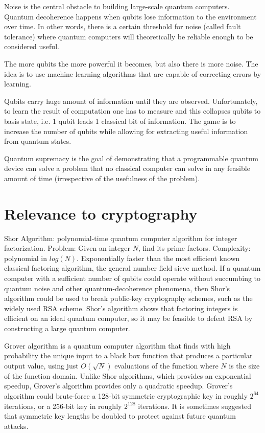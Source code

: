 Noise is the central obstacle to building large-scale quantum computers.  Quantum decoherence happens when qubits lose information to the environment over time. In other words, there is a certain threshold for noise (called fault tolerance) where quantum computers will theoretically be reliable enough to be considered useful.

The more qubits the more powerful it becomes, but also there is more noise. The idea is to use machine learning algorithms that are capable of correcting errors by learning.

Qubits carry huge amount of information until they are observed. Unfortunately, to learn the result of computation one has to measure and this collapses qubits to basis state, i.e. 1 qubit leads 1 classical bit of information. The game is to increase the number of qubits while allowing for extracting useful information from quantum states.

Quantum supremacy is the goal of demonstrating that a programmable quantum device can solve a problem that no classical computer can solve in any feasible amount of time (irrespective of the usefulness of the problem).

\section{Relevance to cryptography}

Shor Algorithm: polynomial-time quantum computer algorithm for integer factorization. Problem: Given an integer $N$, find its prime factors. Complexity: polynomial in $log(N)$. Exponentially faster than the most efficient known classical factoring algorithm, the general number field sieve method.
If a quantum computer with a sufficient number of qubits could operate without succumbing to quantum noise and other quantum-decoherence phenomena, then Shor's algorithm could be used to break public-key cryptography schemes, such as the widely used RSA scheme. Shor's algorithm shows that factoring integers is efficient on an ideal quantum computer, so it may be feasible to defeat RSA by constructing a large quantum computer.

Grover algorithm is a quantum computer algorithm that finds with high probability the unique input to a black box function that produces a particular output value, using just $O(\sqrt{N})$ evaluations of the function where $N$ is the size of the function domain. Unlike Shor algorithms, which provides an exponential speedup, Grover's algorithm provides only a quadratic speedup. Grover's algorithm could brute-force a 128-bit symmetric cryptographic key in roughly $2^{64}$ iterations, or a 256-bit key in roughly $2^{128}$ iterations. It is sometimes suggested that symmetric key lengths be doubled to protect against future quantum attacks.

